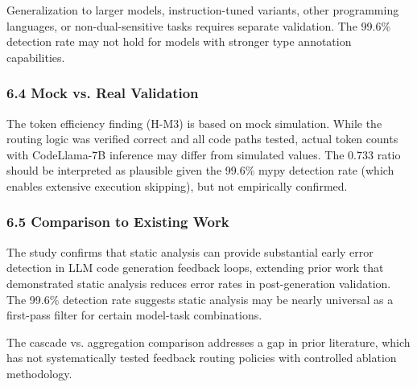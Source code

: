 Generalization to larger models, instruction-tuned variants, other programming languages, or non-dual-sensitive tasks requires separate validation. The 99.6\% detection rate may not hold for models with stronger type annotation capabilities.

\subsubsection{6.4 Mock vs. Real Validation}

The token efficiency finding (H-M3) is based on mock simulation. While the routing logic was verified correct and all code paths tested, actual token counts with CodeLlama-7B inference may differ from simulated values. The 0.733 ratio should be interpreted as plausible given the 99.6\% mypy detection rate (which enables extensive execution skipping), but not empirically confirmed.

\subsubsection{6.5 Comparison to Existing Work}

The study confirms that static analysis can provide substantial early error detection in LLM code generation feedback loops, extending prior work that demonstrated static analysis reduces error rates in post-generation validation. The 99.6\% detection rate suggests static analysis may be nearly universal as a first-pass filter for certain model-task combinations.

The cascade vs. aggregation comparison addresses a gap in prior literature, which has not systematically tested feedback routing policies with controlled ablation methodology.
